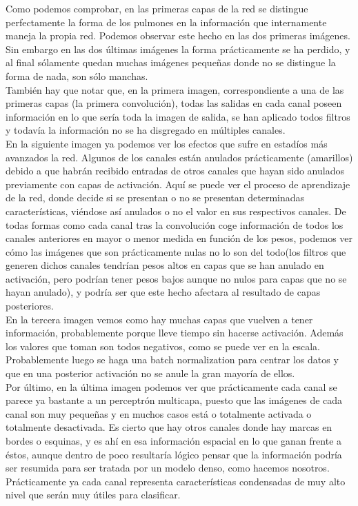 \documentclass[11pt,a4paper]{article}
\theoremstyle{definition}
\begin{document}
Como podemos comprobar, en las primeras capas de la red se distingue perfectamente la forma de los pulmones en la información que internamente maneja la propia red.  Podemos observar este hecho en las dos primeras imágenes.  Sin embargo en las dos últimas imágenes la forma prácticamente se ha perdido, y al final sólamente quedan muchas imágenes pequeñas donde no se distingue la forma de nada, son sólo manchas. \\

También hay que notar que, en la primera imagen,  correspondiente a una de las primeras capas (la primera convolución),  todas las salidas en cada canal poseen información en lo que sería toda la imagen de salida,  se han aplicado todos filtros y todavía la información no se ha disgregado en múltiples canales. \\

En la siguiente imagen ya podemos ver los efectos que sufre en estadíos más avanzados la red.  Algunos de los canales están anulados prácticamente (amarillos) debido a que habrán recibido entradas de otros canales que hayan sido anulados previamente con capas de activación. Aquí se puede ver el proceso de aprendizaje de la red, donde decide si se presentan o no se presentan determinadas características, viéndose así anulados o no el valor en sus respectivos canales.  De todas formas como cada canal tras la convolución coge información de todos los canales anteriores en mayor o menor medida en función de los pesos, podemos ver cómo las imágenes que son prácticamente nulas no lo son del todo(los filtros que generen dichos canales tendrían pesos altos en capas que se han anulado en activación, pero podrían tener pesos bajos aunque no nulos para capas que no se hayan anulado), y podría ser que este hecho afectara al resultado de capas posteriores.\\

En la tercera imagen vemos como hay muchas capas que vuelven a tener información,  probablemente porque lleve tiempo sin hacerse activación.  Además los valores que toman son todos negativos, como se puede ver en la escala. Probablemente luego se haga una batch normalization para centrar los datos y que en una posterior activación no se anule la gran mayoría de ellos.\\

Por último, en la última imagen podemos ver que prácticamente cada canal se parece ya bastante a un perceptrón multicapa,  puesto que las imágenes de cada canal son muy pequeñas y en muchos casos está o totalmente activada o totalmente desactivada. Es cierto que hay otros canales donde hay marcas en bordes o esquinas, y es ahí en esa información espacial en lo que ganan frente a éstos, aunque dentro de poco resultaría lógico pensar que la información podría ser resumida para ser tratada por un modelo denso, como hacemos nosotros.  Prácticamente ya cada canal representa características condensadas de muy alto nivel que serán muy útiles para clasificar.\\
\end{document}

